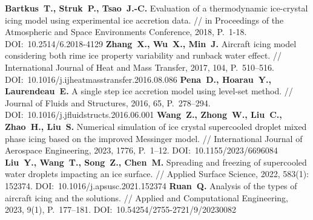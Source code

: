 \begin{thebibliography}{99}
%
\textbf{Bartkus~T., Struk~P., Tsao~J.-C.} Evaluation of a thermodynamic ice-crystal icing model using experimental ice accretion data. // in Proceedings of the Atmospheric and Space Environments Conference, 2018, P.~1-18. DOI:~10.2514/6.2018-4129
%
\textbf{Zhang~X., Wu~X., Min~J.} Aircraft icing model considering both rime ice property variability and runback water effect. // International Journal of Heat and Mass Transfer, 2017, 104, P.~510–516. DOI:~10.1016/j.ijheatmasstransfer.2016.08.086
%
\textbf{Pena~D., Hoarau~Y., Laurendeau~E.} A single step ice accretion model using level-set method. // Journal of Fluids and Structures, 2016, 65, P.~278–294. DOI:~10.1016/j.jfluidstructs.2016.06.001
%
\textbf{Wang~Z., Zhong~W., Liu~C., Zhao~H., Liu~S.} Numerical simulation of ice crystal supercooled droplet mixed phase icing based on the improved Messinger model. // International Journal of Aerospace Engineering, 2023, 1776, P.~1–12. DOI:~10.1155/2023/6696084
%
\textbf{Liu~Y., Wang~T., Song~Z., Chen~M.} Spreading and freezing of supercooled water droplets impacting an ice surface. // Applied Surface Science, 2022, 583(1): 152374. DOI:~10.1016/j.apsusc.2021.152374
%
\textbf{Ruan~Q.} Analysis of the types of aircraft icing and the solutions. // Applied and Computational Engineering, 2023, 9(1), P.~177–181. DOI:~10.54254/2755-2721/9/20230082
%






%
%







\end{thebibliography}
